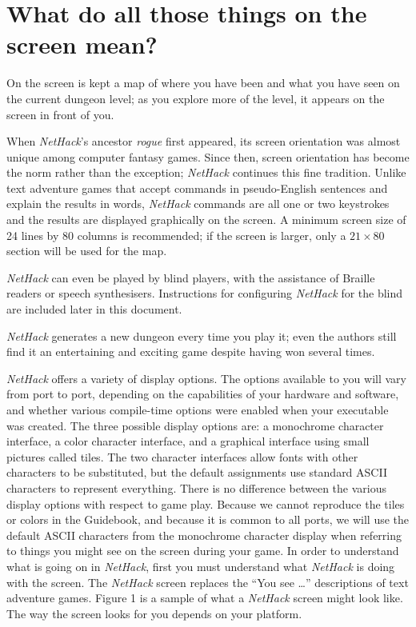 \section{What do all those things on the screen mean?}
On the screen is kept a map of where you have been and what you have
seen on the current dungeon level; as you explore more of the level,
it appears on the screen in front of you.

When {\it NetHack\/}'s ancestor {\it rogue\/} first appeared, its screen
orientation was almost unique among computer fantasy games.  Since
then, screen orientation has become the norm rather than the
exception; {\it NetHack\/} continues this fine tradition.  Unlike text
adventure games that accept commands in pseudo-English sentences and
explain the results in words, {\it NetHack\/} commands are all one or two
keystrokes and the results are displayed graphically on the screen.  A
minimum screen size of 24 lines by 80 columns is recommended; if the
screen is larger, only a $21\times80$ section will be used for the map.

{\it NetHack\/} can even be played by blind players, with the assistance of
Braille readers or speech synthesisers.  Instructions for configuring
{\it NetHack\/} for the blind are included later in this document.

{\it NetHack\/} generates a new dungeon every time you play it; even the
authors still find it an entertaining and exciting game despite
having won several times.

{\it NetHack\/} offers a variety of display options.  The options available to
you will vary from port to port, depending on the capabilities of your
hardware and software, and whether various compile-time options were
enabled when your executable was created.  The three possible display
options are: a monochrome character interface, a color character interface,
and a graphical interface using small pictures called tiles.  The two
character interfaces allow fonts with other characters to be substituted,
but the default assignments use standard ASCII characters to represent
everything.  There is no difference between the various display options
with respect to game play.  Because we cannot reproduce the tiles or
colors in the Guidebook, and because it is common to all ports, we will
use the default ASCII characters from the monochrome character display
when referring to things you might see on the screen during your game.
In order to understand what is going on in {\it NetHack}, first you must
understand what {\it NetHack\/} is doing with the screen.  The {\it NetHack\/}
screen replaces the ``You see \ldots'' descriptions of text adventure games.
Figure 1 is a sample of what a {\it NetHack\/} screen might look like.
The way the screen looks for you depends on your platform.

